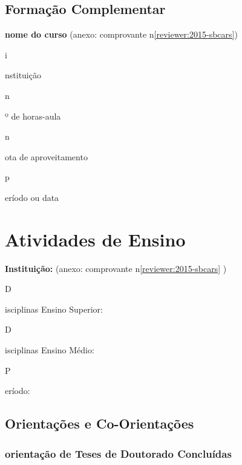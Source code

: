 \documentclass[a4paper,oneside,12pt]{article}
\newcommand{\SubItem}[1]{
    {\setlength\itemindent{15pt} \item[-] #1}}
\newcounter{document}%
\begin{document}
\subsection{Formação Complementar}
\begin{enumerate}
\renewcommand{\labelenumi}{{\large\bfseries\arabic{enumi}.}}
    \item \textbf{nome do curso} (anexo: comprovante n\degree \ref{reviewer:2015-sbcars})
        \SubItem instituição 
        \SubItem nº de horas-aula 
        \SubItem nota de aproveitamento 
        \SubItem período ou data 
\end{enumerate}

\newpage
\section{Atividades de Ensino}
\vspace{0.3cm}

\begin{enumerate}
    \item \textbf{Instituição: } (anexo: comprovante n\degree \ref{reviewer:2015-sbcars} )
        \SubItem Disciplinas Ensino Superior:
        \SubItem Disciplinas Ensino Médio:
        \SubItem Período:  
\end{enumerate}



\subsection{Orientações e Co-Orientações}
\vspace{0.3cm}

\subsubsection{orientação de Teses de Doutorado Concluídas}
\vspace{0.3cm}
\end{document}
